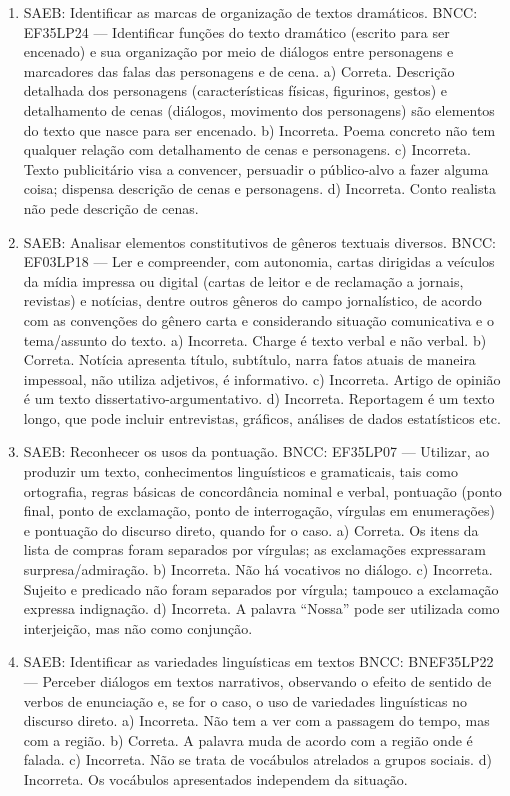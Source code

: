 \begin{enumerate}
\item
SAEB: Identificar as marcas de organização de textos dramáticos. BNCC: EF35LP24 --- Identificar funções do texto dramático (escrito para ser encenado) e sua organização por meio de diálogos entre personagens e marcadores das falas das personagens e de cena. a) Correta. Descrição detalhada dos personagens (características físicas, figurinos, gestos) e detalhamento de cenas (diálogos, movimento dos personagens) são elementos do texto que nasce para ser encenado. b) Incorreta. Poema concreto não tem qualquer relação com detalhamento de cenas e personagens. c) Incorreta. Texto publicitário visa a convencer, persuadir o público-alvo a fazer alguma coisa; dispensa descrição de cenas e personagens.
d) Incorreta. Conto realista não pede descrição de cenas.

\item
SAEB: Analisar elementos constitutivos de gêneros textuais diversos. BNCC: EF03LP18 --- Ler e compreender, com autonomia, cartas dirigidas a veículos da mídia impressa ou digital (cartas de leitor e de reclamação a jornais, revistas) e notícias, dentre outros gêneros do campo jornalístico, de acordo com as convenções do gênero carta e considerando situação comunicativa e o tema/assunto do texto. a) Incorreta. Charge é texto verbal e não verbal. b) Correta. Notícia apresenta título, subtítulo, narra fatos atuais de maneira impessoal, não utiliza adjetivos, é informativo. c) Incorreta. Artigo de opinião é um texto dissertativo-argumentativo. d) Incorreta. Reportagem é um texto longo, que pode incluir entrevistas,
gráficos, análises de dados estatísticos etc.

\item
SAEB: Reconhecer os usos da pontuação. BNCC: EF35LP07 --- Utilizar, ao produzir um texto, conhecimentos linguísticos e gramaticais, tais como ortografia, regras básicas de concordância nominal e verbal, pontuação (ponto final, ponto de exclamação, ponto de interrogação, vírgulas em enumerações) e pontuação do discurso direto, quando for o caso. a) Correta. Os itens da lista de compras foram separados por vírgulas; as exclamações expressaram surpresa/admiração. b) Incorreta. Não há vocativos no diálogo. c) Incorreta. Sujeito e predicado não foram separados por vírgula; tampouco a exclamação expressa indignação. d) Incorreta. A palavra ``Nossa'' pode ser utilizada como interjeição, mas não como conjunção.

\item
SAEB: Identificar as variedades linguísticas em textos BNCC: BNEF35LP22 --- Perceber diálogos em textos narrativos, observando o efeito de sentido de verbos de enunciação e, se for o caso, o uso de variedades linguísticas no discurso direto. a) Incorreta. Não tem a ver com a passagem do tempo, mas com a região. b) Correta. A palavra muda de acordo com a região onde é falada. c) Incorreta. Não se trata de vocábulos atrelados a grupos sociais. d) Incorreta. Os vocábulos apresentados independem da situação.


\end{enumerate}
